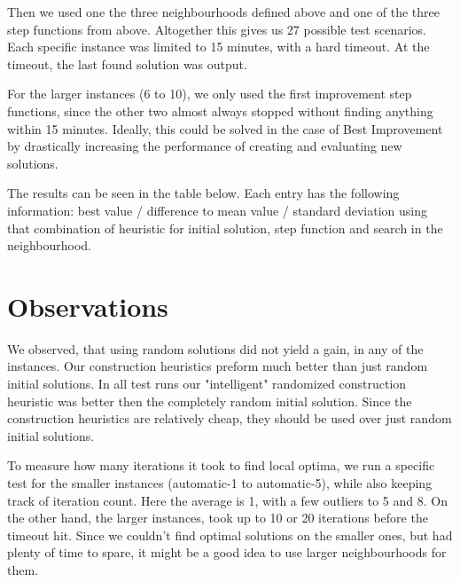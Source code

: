 \documentclass [11pt]{article}
\begin{document}
Then we used one the three neighbourhoods defined above and one of the three step functions from above. Altogether this gives us 27 possible test scenarios.  Each specific instance was limited to 15 minutes, with a hard timeout. At the timeout, the last found solution was output. 

For the larger instances (6 to 10), we only used the first improvement step functions, since the other two almost always stopped without finding anything within 15 minutes. Ideally, this could be solved in the case of Best Improvement by drastically increasing the performance of creating and evaluating new solutions. 

The results can be seen in the table below. Each entry has the following information: best value / difference to mean value / standard deviation using that combination of heuristic for initial solution, step function and search in the neighbourhood. 

\section{Observations}
We observed, that using random solutions did not yield a gain, in any of the instances. Our construction heuristics preform much better than just random initial solutions. In all test runs our "intelligent" randomized construction heuristic was better then the completely random initial solution.  Since the construction heuristics are relatively cheap, they should be used over just random initial solutions.

To measure how many iterations it took to find local optima, we run a specific test for the smaller instances (automatic-1 to automatic-5), while also keeping track of iteration count. Here the average is 1, with a few outliers to 5 and 8. On the other hand, the larger instances, took up to 10 or 20 iterations before the timeout hit. Since we couldn't find optimal solutions on the smaller ones, but had plenty of time to spare, it might be a good idea to use larger neighbourhoods for them. 
\end{document}
